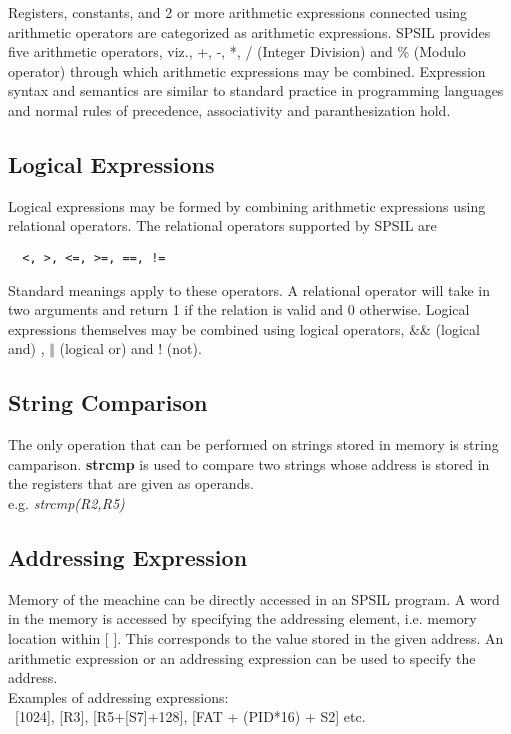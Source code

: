 Registers, constants, and 2 or more arithmetic expressions connected using arithmetic operators are categorized as arithmetic expressions. SPSIL provides five arithmetic operators, viz., +, -, *, / (Integer Division) and \% (Modulo operator) through which arithmetic expressions may be combined. Expression syntax and semantics are similar to standard practice in programming languages and normal rules of precedence, associativity and paranthesization hold. 


\subsection{Logical Expressions}

Logical expressions may be formed by combining arithmetic expressions using relational operators. The relational operators supported by SPSIL are \begin{verbatim}  <, >, <=, >=, ==, !=
\end{verbatim}
Standard  meanings apply to these operators. A relational operator will take in two arguments and return 1 if the relation is valid and 0 otherwise. Logical expressions themselves may be combined using logical operators, \&\& (logical and) ,  $\Vert$ (logical or) and ! (not).

\subsection{String Comparison}
The only operation that can be performed on strings stored in memory is string camparison. \textbf{strcmp} is used to compare two strings whose address is stored in the registers that are given as operands. \\

 e.g. \textit{strcmp(R2,R5)}


\subsection{Addressing Expression}
Memory of the meachine can be directly accessed in an SPSIL program. A word in the memory is accessed by specifying the addressing element, i.e. memory location within [ ]. This  corresponds to the value stored in the given address. An arithmetic expression or an addressing expression can be used to specify the address. \\

Examples of addressing expressions: \\\   
 [1024], [R3], [R5+[S7]+128], [FAT + (PID*16) + S2] etc.


